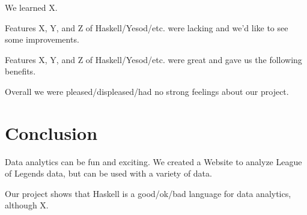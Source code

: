 \documentclass[letterpaper,twocolumn,9pt]{article}
\begin{document}
We learned X.

Features X, Y, and Z of Haskell/Yesod/etc. were lacking and we'd like to see some improvements.

Features X, Y, and Z of Haskell/Yesod/etc. were great and gave us the following benefits.

Overall we were pleased/displeased/had no strong feelings about our project.

\section{Conclusion}
\label{conclusion}

Data analytics can be fun and exciting. We created a Website to analyze League of Legends data, but can be used with a variety of data.

Our project shows that Haskell is a good/ok/bad language for data analytics, although X. 

{\footnotesize 
}
\end{document}
